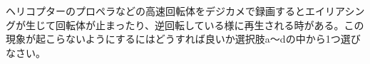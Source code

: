 ヘリコプターのプロペラなどの高速回転体をデジカメで録画するとエイリアシングが生じて回転体が止まったり、逆回転している様に再生される時がある。この現象が起こらないようにするにはどうすれば良いか選択肢a〜dの中から1つ選びなさい。

